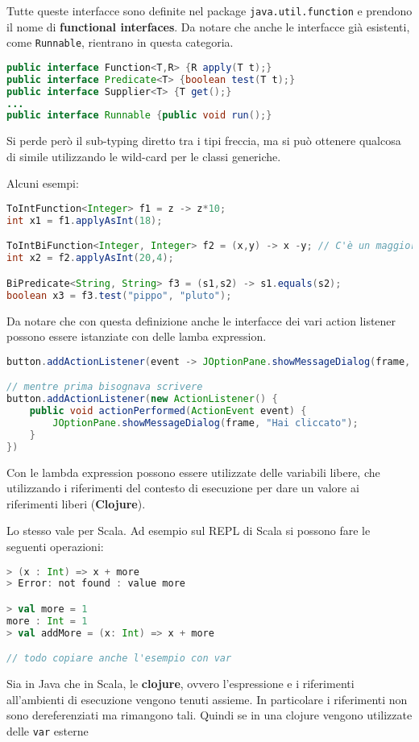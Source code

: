 Tutte queste interfacce sono definite nel package \texttt{java.util.function} e prendono il nome di \textbf{functional interfaces}.
Da notare che anche le interfacce già esistenti, come \texttt{Runnable}, rientrano in questa categoria.

\begin{lstlisting}[language=Java]
public interface Function<T,R> {R apply(T t);}
public interface Predicate<T> {boolean test(T t);}
public interface Supplier<T> {T get();}
...
public interface Runnable {public void run();}
\end{lstlisting}

Si perde però il sub-typing diretto tra i tipi freccia, ma si può ottenere qualcosa di simile utilizzando le wild-card per le classi generiche.

Alcuni esempi:

\begin{lstlisting}[language=Java]
ToIntFunction<Integer> f1 = z -> z*10;
int x1 = f1.applyAsInt(18);

ToIntBiFunction<Integer, Integer> f2 = (x,y) -> x -y; // C'è un maggior lavoro di type-inference
int x2 = f2.applyAsInt(20,4);

BiPredicate<String, String> f3 = (s1,s2) -> s1.equals(s2);
boolean x3 = f3.test("pippo", "pluto");
\end{lstlisting}

Da notare che con questa definizione anche le interfacce dei vari action listener possono essere istanziate con delle lamba expression.

\begin{lstlisting}[language=Java, caption=Da notare che la variabile frame della lamba expression è libera e prende un valore dal contesto di invocazione del metodo.]
button.addActionListener(event -> JOptionPane.showMessageDialog(frame, "Hai cliccato"));

// mentre prima bisognava scrivere
button.addActionListener(new ActionListener() {
	public void actionPerformed(ActionEvent event) {
		JOptionPane.showMessageDialog(frame, "Hai cliccato");
	}
})
\end{lstlisting}

Con le lambda expression possono essere utilizzate delle variabili libere, che utilizzando i riferimenti del contesto di esecuzione per dare un valore ai riferimenti liberi (\textbf{Clojure}).

Lo stesso vale per Scala. Ad esempio sul REPL di Scala si possono fare le seguenti operazioni:

\begin{lstlisting}[language = Scala]
> (x : Int) => x + more
> Error: not found : value more

> val more = 1
more : Int = 1 
> val addMore = (x: Int) => x + more

// todo copiare anche l'esempio con var
\end{lstlisting}

Sia in Java che in Scala, le \textbf{clojure}, ovvero l'espressione e i riferimenti all'ambienti di esecuzione vengono tenuti assieme. In particolare i riferimenti non sono dereferenziati ma rimangono tali. Quindi se in una clojure vengono utilizzate delle \texttt{var} esterne 


